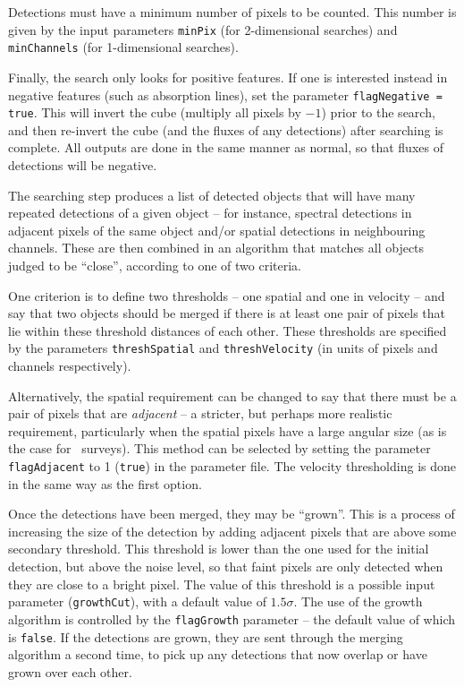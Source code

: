Detections must have a minimum number of pixels to be counted. This
number is given by the input parameters \texttt{minPix} (for
2-dimensional searches) and \texttt{minChannels} (for 1-dimensional
searches).

Finally, the search only looks for positive features. If one is
interested instead in negative features (such as absorption lines),
set the parameter \texttt{flagNegative = true}. This will invert the
cube (\ie multiply all pixels by $-1$) prior to the search, and then
re-invert the cube (and the fluxes of any detections) after searching
is complete. All outputs are done in the same manner as normal, so
that fluxes of detections will be negative.

\label{sec-merger}

The searching step produces a list of detected objects that will have
many repeated detections of a given object -- for instance, spectral
detections in adjacent pixels of the same object and/or spatial
detections in neighbouring channels. These are then combined in an
algorithm that matches all objects judged to be ``close'', according
to one of two criteria.

One criterion is to define two thresholds -- one spatial and one in
velocity -- and say that two objects should be merged if there is at
least one pair of pixels that lie within these threshold distances of
each other. These thresholds are specified by the parameters
\texttt{threshSpatial} and \texttt{threshVelocity} (in units of pixels
and channels respectively).

Alternatively, the spatial requirement can be changed to say that
there must be a pair of pixels that are \emph{adjacent} -- a stricter,
but perhaps more realistic requirement, particularly when the spatial
pixels have a large angular size (as is the case for \hi\
surveys). This method can be selected by setting the parameter
\texttt{flagAdjacent} to 1 (\ie \texttt{true}) in the parameter
file. The velocity thresholding is done in the same way as the first
option.

Once the detections have been merged, they may be ``grown''. This is a
process of increasing the size of the detection by adding adjacent
pixels that are above some secondary threshold. This threshold is
lower than the one used for the initial detection, but above the noise
level, so that faint pixels are only detected when they are close to a
bright pixel. The value of this threshold is a possible input
parameter (\texttt{growthCut}), with a default value of
$1.5\sigma$. The use of the growth algorithm is controlled by the
\texttt{flagGrowth} parameter -- the default value of which is
\texttt{false}. If the detections are grown, they are sent through the
merging algorithm a second time, to pick up any detections that now
overlap or have grown over each other.

